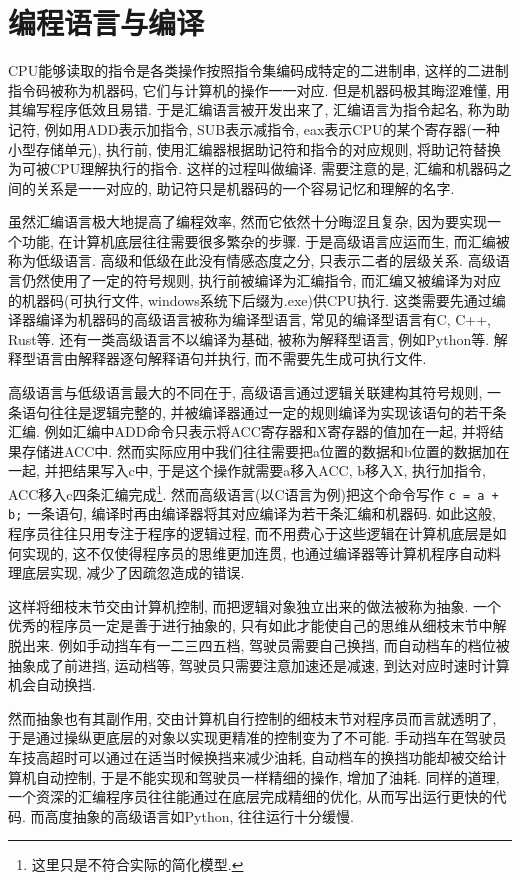     \section{编程语言与编译} \label{编程语言与编译}
        CPU能够读取的指令是各类操作按照指令集编码成特定的二进制串, 这样的二进制指令码被称为机器码, 它们与计算机的操作一一对应. 但是机器码极其晦涩难懂, 用其编写程序低效且易错. 于是汇编语言被开发出来了, 汇编语言为指令起名, 称为助记符, 例如用ADD表示加指令, SUB表示减指令, eax表示CPU的某个寄存器(一种小型存储单元), 执行前, 使用汇编器根据助记符和指令的对应规则, 将助记符替换为可被CPU理解执行的指令. 这样的过程叫做编译. 需要注意的是, 汇编和机器码之间的关系是一一对应的, 助记符只是机器码的一个容易记忆和理解的名字.

        虽然汇编语言极大地提高了编程效率, 然而它依然十分晦涩且复杂, 因为要实现一个功能, 在计算机底层往往需要很多繁杂的步骤. 于是高级语言应运而生, 而汇编被称为低级语言. 高级和低级在此没有情感态度之分, 只表示二者的层级关系. 高级语言仍然使用了一定的符号规则, 执行前被编译为汇编指令, 而汇编又被编译为对应的机器码(可执行文件, windows系统下后缀为.exe)供CPU执行. 这类需要先通过编译器编译为机器码的高级语言被称为编译型语言, 常见的编译型语言有C, C++, Rust等. 还有一类高级语言不以编译为基础, 被称为解释型语言, 例如Python等. 解释型语言由解释器逐句解释语句并执行, 而不需要先生成可执行文件.
        
        高级语言与低级语言最大的不同在于, 高级语言通过逻辑关联建构其符号规则, 一条语句往往是逻辑完整的, 并被编译器通过一定的规则编译为实现该语句的若干条汇编. 例如汇编中ADD命令只表示将ACC寄存器和X寄存器的值加在一起, 并将结果存储进ACC中. 然而实际应用中我们往往需要把a位置的数据和b位置的数据加在一起, 并把结果写入c中, 于是这个操作就需要a移入ACC, b移入X, 执行加指令, ACC移入c四条汇编完成\footnote{这里只是不符合实际的简化模型.}. 然而高级语言(以C语言为例)把这个命令写作 \texttt{c = a + b;} 一条语句, 编译时再由编译器将其对应编译为若干条汇编和机器码. 如此这般, 程序员往往只用专注于程序的逻辑过程, 而不用费心于这些逻辑在计算机底层是如何实现的, 这不仅使得程序员的思维更加连贯, 也通过编译器等计算机程序自动料理底层实现, 减少了因疏忽造成的错误.

        这样将细枝末节交由计算机控制, 而把逻辑对象独立出来的做法被称为抽象. 一个优秀的程序员一定是善于进行抽象的, 只有如此才能使自己的思维从细枝末节中解脱出来. 例如手动挡车有一二三四五档, 驾驶员需要自己换挡, 而自动档车的档位被抽象成了前进挡, 运动档等, 驾驶员只需要注意加速还是减速, 到达对应时速时计算机会自动换挡. 
        
        然而抽象也有其副作用, 交由计算机自行控制的细枝末节对程序员而言就透明了, 于是通过操纵更底层的对象以实现更精准的控制变为了不可能. 手动挡车在驾驶员车技高超时可以通过在适当时候换挡来减少油耗, 自动档车的换挡功能却被交给计算机自动控制, 于是不能实现和驾驶员一样精细的操作, 增加了油耗. 同样的道理, 一个资深的汇编程序员往往能通过在底层完成精细的优化, 从而写出运行更快的代码. 而高度抽象的高级语言如Python, 往往运行十分缓慢.

